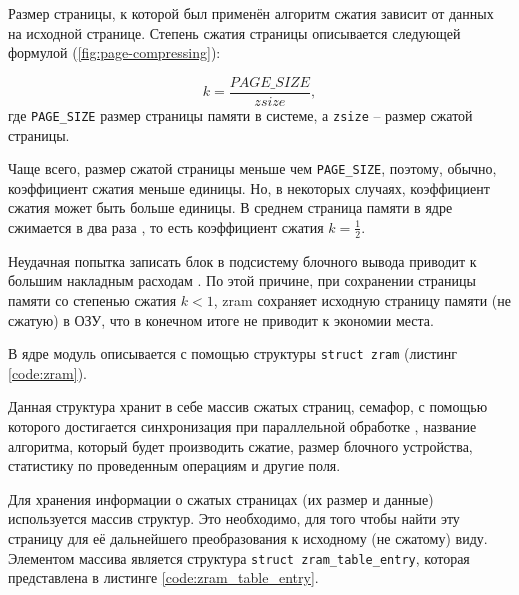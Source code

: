 Размер страницы, к которой был применён алгоритм сжатия зависит от данных на исходной странице. Степень сжатия страницы описывается следующей формулой (\ref{fig:page-compressing}):

\begin{equation}\label{fig:page-compressing}
	k = \frac{PAGE\_SIZE}{zsize},
\end{equation}
где \texttt{PAGE\_SIZE} размер страницы памяти в системе, а \texttt{zsize} -- размер сжатой страницы. 

Чаще всего, размер сжатой страницы меньше чем \texttt{PAGE\_SIZE}, поэтому, обычно, коэффициент сжатия меньше единицы. Но, в некоторых случаях, коэффициент сжатия может быть больше единицы. В среднем страница памяти в ядре сжимается в два раза \cite{in-kernel-memory-compression}, то есть коэффициент сжатия $ k =\frac{1}{2}$.

Неудачная попытка записать блок в подсистему блочного вывода приводит к большим накладным расходам \cite{in-kernel-memory-compression}. По этой причине, при сохранении страницы памяти со степенью сжатия $k < 1$, zram сохраняет исходную страницу памяти (не сжатую) в ОЗУ, что в конечном итоге не приводит к экономии места.

В ядре модуль описывается с помощью структуры \texttt{struct zram} (листинг \ref{code:zram}).

Данная структура хранит в себе массив сжатых страниц, семафор, с помощью которого достигается синхронизация при параллельной обработке \cite{in-kernel-memory-compression}, название алгоритма, который будет производить сжатие, размер блочного устройства, статистику по проведенным операциям и другие поля.

Для хранения информации о сжатых страницах (их размер и данные) используется массив структур. Это необходимо, для того чтобы найти эту страницу для её дальнейшего преобразования к исходному (не сжатому) виду. Элементом массива является структура \texttt{struct zram\_table\_entry}, которая представлена в листинге \ref{code:zram_table_entry}.


